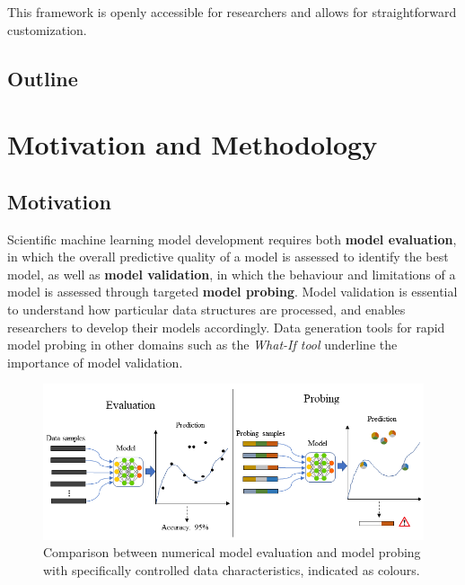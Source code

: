 \documentclass[runningheads]{llncs}
\begin{document}
This framework is openly accessible for researchers and allows for straightforward customization.


\subsection{Outline}


\section{Motivation and Methodology}\label{Sec:Motivation}

\subsection{Motivation}

Scientific machine learning model development requires both \textbf{model evaluation}, in which the overall predictive quality of a model is assessed to identify the best model, as well as \textbf{model validation}, in which the behaviour and limitations of a model is assessed through targeted \textbf{model probing}. Model validation is essential to understand how particular data structures are processed, and enables researchers to develop their models accordingly. Data generation tools for rapid model probing in other domains such as the \textit{What-If tool} \cite{wexler2019if} underline the importance of model validation.


\begin{figure}
\centering
\includegraphics[width=\textwidth]{images/Eva_Prob.png}
\caption{Comparison between numerical model evaluation and model probing with specifically controlled data characteristics, indicated as colours.}
\end{figure}
\end{document}
